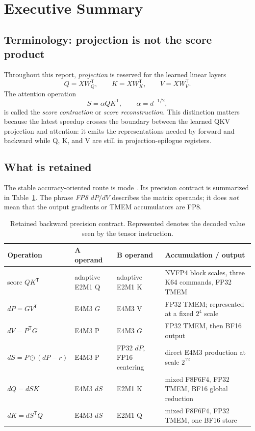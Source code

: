 \section{Executive Summary}

\subsection{Terminology: projection is not the score product}

Throughout this report, \emph{projection} is reserved for the learned linear
layers
\begin{equation}
  Q=XW_Q^\mathsf{T},\qquad
  K=XW_K^\mathsf{T},\qquad
  V=XW_V^\mathsf{T}.
  \label{eq:learned-projections-summary}
\end{equation}
The attention operation
\begin{equation}
  S=\alpha QK^\mathsf{T},\qquad \alpha=d^{-1/2},
  \label{eq:score-contraction-summary}
\end{equation}
is called the \emph{score contraction} or \emph{score reconstruction}.  This
distinction matters because the latest speedup crosses the boundary between
the learned QKV projection and attention: it emits the representations needed
by forward and backward while Q, K, and V are still in
projection-epilogue registers.

\subsection{What is retained}

The stable accuracy-oriented route is mode
.  Its precision contract is summarized
in Table~\ref{tab:retained-precision-summary}.  The phrase \emph{FP8
$dP/dV$} describes the matrix operands; it does \emph{not} mean that the
output gradients or TMEM accumulators are FP8.

\begin{table}[htbp]
\centering
\caption{Retained backward precision contract.  Represented denotes the
decoded value seen by the tensor instruction.}
\label{tab:retained-precision-summary}
\small
\begin{tabularx}{\textwidth}{l l l X}
\toprule
Operation & A operand & B operand & Accumulation / output \\
\midrule
score $QK^\mathsf{T}$ & adaptive E2M1 Q & adaptive E2M1 K &
NVFP4 block scales, three K64 commands, FP32 TMEM \\
$dP=GV^\mathsf{T}$ & E4M3 $G$ & E4M3 V &
FP32 TMEM; represented at a fixed $2^4$ scale \\
$dV=P^\mathsf{T}G$ & E4M3 P & E4M3 $G$ &
FP32 TMEM, then BF16 output \\
$dS=P\odot(dP-r)$ & E4M3 P & FP32 $dP$, FP16 centering &
direct E4M3 production at scale $2^{12}$ \\
$dQ=dSK$ & E4M3 $dS$ & E2M1 K &
mixed F8F6F4, FP32 TMEM, BF16 global reduction \\
$dK=dS^\mathsf{T}Q$ & E4M3 $dS$ & E2M1 Q &
mixed F8F6F4, FP32 TMEM, one BF16 store \\
\bottomrule
\end{tabularx}
\end{table}

